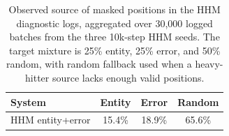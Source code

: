 \begin{table}[t]
\centering
\small
\begin{tabular}{lccc}
\toprule
\textbf{System} & \textbf{Entity} & \textbf{Error} & \textbf{Random} \\
\midrule
HHM entity+error & 15.4\% & 18.9\% & 65.6\% \\
\bottomrule
\end{tabular}
\caption{Observed source of masked positions in the HHM diagnostic logs, aggregated over 30{,}000 logged batches from the three 10k-step HHM seeds. The target mixture is 25\% entity, 25\% error, and 50\% random, with random fallback used when a heavy-hitter source lacks enough valid positions.}
\label{tab:mask-diagnostics}
\end{table}
